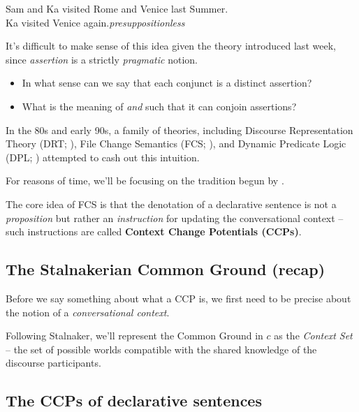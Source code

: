 \documentclass[cronos,landscape,paper=letter]{ling-handout}
\begin{document}
\ex\label{conj2}
Sam and Ka visited Rome and Venice last Summer.\\
Ka visited Venice again.\hfill\textit{presuppositionless}
\xe

It's difficult to make sense of this idea given the theory introduced last week, since \textit{assertion} is a strictly \textit{pragmatic} notion.

\begin{itemize}

  \item In what sense can we say that each conjunct is a distinct assertion?

  \item What is the meaning of \textit{and} such that it can conjoin assertions?

\end{itemize}

In the 80s and early 90s, a family of theories, including Discourse Representation Theory (DRT; \citealt{kamp1981}), File Change Semantics (FCS; \citealt[ch.\,3]{heim1982}), and Dynamic Predicate Logic (DPL; \citealt{groenendijk_dynamic_1991}) attempted to cash out this intuition.

For reasons of time, we'll be focusing on the tradition begun by \citeauthor{heim1982}.

The core idea of FCS is that the denotation of a declarative sentence is not a \textit{proposition} but rather an \textit{instruction} for updating the conversational context -- such instructions are called \textbf{Context Change Potentials (CCPs)}.

\subsection{The Stalnakerian Common Ground (recap)}

Before we say something about what a CCP is, we first need to be precise about the notion of a \textit{conversational context}.

Following Stalnaker, we'll represent the Common Ground in \(c\) as the \textit{Context Set} -- the set of possible worlds compatible with the shared knowledge of the discourse participants.



\subsection{The CCPs of declarative sentences}
\end{document}
